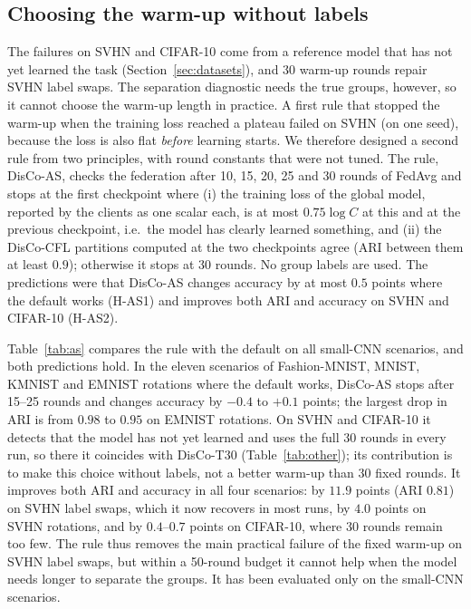 \subsection{Choosing the warm-up without labels}\label{sec:warmup}
The failures on SVHN and CIFAR-10 come from a reference model that has not yet learned the task (Section~\ref{sec:datasets}), and 30 warm-up rounds repair SVHN label swaps. The separation diagnostic needs the true groups, however, so it cannot choose the warm-up length in practice. A first rule that stopped the warm-up when the training loss reached a plateau failed on SVHN (on one seed), because the loss is also flat \emph{before} learning starts. We therefore designed a second rule from two principles, with round constants that were not tuned. The rule, DisCo-AS, checks the federation after 10, 15, 20, 25 and 30 rounds of FedAvg and stops at the first checkpoint where (i) the training loss of the global model, reported by the clients as one scalar each, is at most $0.75\log C$ at this and at the previous checkpoint, i.e.\ the model has clearly learned something, and (ii) the DisCo-CFL partitions computed at the two checkpoints agree (ARI between them at least $0.9$); otherwise it stops at 30 rounds. No group labels are used. The predictions were that DisCo-AS changes accuracy by at most $0.5$ points where the default works (H-AS1) and improves both ARI and accuracy on SVHN and CIFAR-10 (H-AS2).

Table~\ref{tab:as} compares the rule with the default on all small-CNN scenarios, and both predictions hold. In the eleven scenarios of Fashion-MNIST, MNIST, KMNIST and EMNIST rotations where the default works, DisCo-AS stops after 15--25 rounds and changes accuracy by $-0.4$ to $+0.1$ points; the largest drop in ARI is from $0.98$ to $0.95$ on EMNIST rotations. On SVHN and CIFAR-10 it detects that the model has not yet learned and uses the full 30 rounds in every run, so there it coincides with DisCo-T30 (Table~\ref{tab:other}); its contribution is to make this choice without labels, not a better warm-up than 30 fixed rounds. It improves both ARI and accuracy in all four scenarios: by $11.9$ points (ARI $0.81$) on SVHN label swaps, which it now recovers in most runs, by $4.0$ points on SVHN rotations, and by $0.4$--$0.7$ points on CIFAR-10, where 30 rounds remain too few. The rule thus removes the main practical failure of the fixed warm-up on SVHN label swaps, but within a 50-round budget it cannot help when the model needs longer to separate the groups. It has been evaluated only on the small-CNN scenarios.

\begin{table}[!htbp]
\centering
\caption{Fixed 10-round warm-up (DisCo) against the label-free stable warm-up (DisCo-AS), on all small-CNN scenarios (5 seeds; sweeps 3 seeds). $\Delta$: difference in mean accuracy (points). $T_0$: warm-up length chosen by DisCo-AS. FMNIST: Fashion-MNIST; QS: quantity skew; part.: participation.}\label{tab:as}

\end{table}
